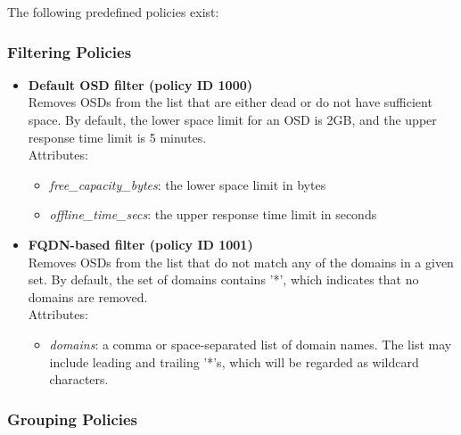 \documentclass[a4paper,10pt]{book}
\begin{document}
The following predefined policies exist:

\subsubsection{Filtering Policies}
\begin{itemize}

 \item \textbf{Default OSD filter (policy ID 1000)}\\
 Removes OSDs from the list that are either dead or do not have sufficient space. By default, the lower space limit for an OSD is 2GB, and the upper response time limit is 5 minutes.\\

 Attributes:
 \begin{itemize}
 \item \emph{free\_capacity\_bytes}: the lower space limit in bytes
 \item \emph{offline\_time\_secs}: the upper response time limit in seconds
 \end{itemize}

 \item \textbf{FQDN-based filter (policy ID 1001)}\\
 Removes OSDs from the list that do not match any of the domains in a given set. By default, the set of domains contains '*', which indicates that no domains are removed.\\

 Attributes:
 \begin{itemize}
 \item \emph{domains}: a comma or space-separated list of domain names. The list may include leading and trailing '*'s, which will be regarded as wildcard characters.
\end{itemize}

\end{itemize}

\subsubsection{Grouping Policies}
\end{document}
